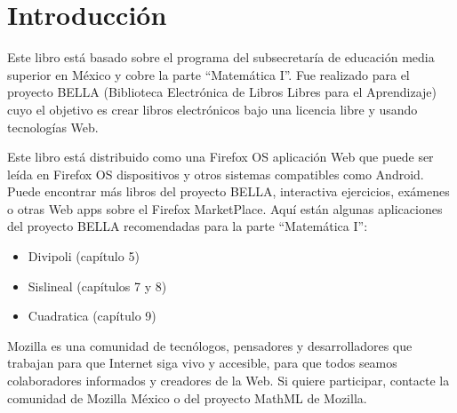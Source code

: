 \section*{Introducción}

Este libro está basado sobre el programa del subsecretaría de educación media
superior en México y cobre la parte ``Matemática I''.
Fue realizado para el proyecto BELLA
(Biblioteca Electrónica de Libros Libres para el Aprendizaje) cuyo el objetivo
es crear libros electrónicos bajo una licencia libre y usando
tecnologías Web.

Este libro está distribuido como una Firefox OS aplicación Web que puede ser leída en Firefox OS dispositivos y otros sistemas compatibles como Android.
Puede encontrar más libros del proyecto BELLA, interactiva
ejercicios, exámenes o otras Web apps sobre el Firefox MarketPlace. Aquí están
algunas aplicaciones del proyecto BELLA recomendadas para la parte
``Matemática I'':

\begin{itemize}
\item Divipoli (capítulo 5)
\item Sislineal (capítulos 7 y 8)
\item Cuadratica (capítulo 9)
\end{itemize}

Mozilla es una comunidad de tecnólogos, pensadores y desarrolladores que
trabajan para que Internet siga vivo y accesible, para que todos seamos
colaboradores informados y creadores de la Web. Si quiere participar, contacte
la comunidad de Mozilla México o del proyecto MathML de Mozilla.
